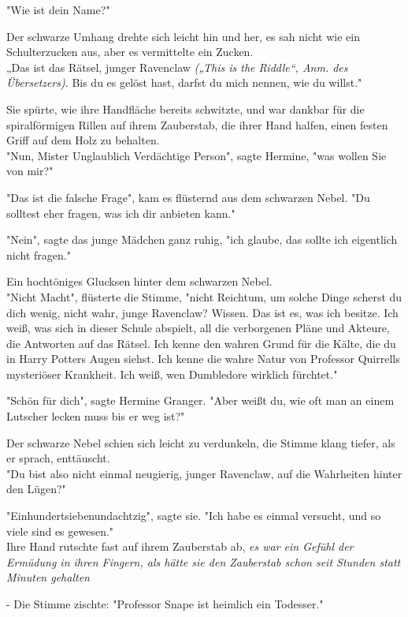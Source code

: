 {"Wie ist dein Name?"

Der schwarze Umhang drehte sich leicht hin und her, es sah nicht wie ein Schulterzucken aus, aber es vermittelte ein Zucken.\\ „Das ist das Rätsel, junger Ravenclaw \emph{(„This is the Riddle“, Anm. des Übersetzers)}. Bis du es gelöst hast, darfst du mich nennen, wie du willst."

Sie spürte, wie ihre Handfläche bereits schwitzte, und war dankbar für die spiralförmigen Rillen auf ihrem Zauberstab, die ihrer Hand halfen, einen festen Griff auf dem Holz zu behalten.\\ "Nun, Mister Unglaublich Verdächtige Person", sagte Hermine, "was wollen Sie von mir?"

"Das ist die falsche Frage", kam es flüsternd aus dem schwarzen Nebel. "Du solltest eher fragen, was ich dir anbieten kann."

"Nein", sagte das junge Mädchen ganz ruhig, "ich glaube, das sollte ich eigentlich nicht fragen."

Ein hochtöniges Glucksen hinter dem schwarzen Nebel.\\ "Nicht Macht", flüsterte die Stimme, "nicht Reichtum, um solche Dinge scherst du dich wenig, nicht wahr, junge Ravenclaw? Wissen. Das ist es, was ich besitze. Ich weiß, was sich in dieser Schule abspielt, all die verborgenen Pläne und Akteure, die Antworten auf das Rätsel. Ich kenne den wahren Grund für die Kälte, die du in Harry Potters Augen siehst. Ich kenne die wahre Natur von Professor Quirrells mysteriöser Krankheit. Ich weiß, wen Dumbledore wirklich fürchtet."

"Schön für dich", sagte Hermine Granger. "Aber weißt du, wie oft man an einem Lutscher lecken muss bis er weg ist?"

Der schwarze Nebel schien sich leicht zu verdunkeln, die Stimme klang tiefer, als er sprach, enttäuscht.\\ "Du bist also nicht einmal neugierig, junger Ravenclaw, auf die Wahrheiten hinter den Lügen?"

"Einhundertsiebenundachtzig", sagte sie. "Ich habe es einmal versucht, und so viele sind es gewesen."\\ Ihre Hand rutschte fast auf ihrem Zauberstab ab, \emph{es war ein Gefühl der Ermüdung in ihren Fingern, als hätte sie den Zauberstab schon seit Stunden statt Minuten gehalten}

- Die Stimme zischte: "Professor Snape ist heimlich ein Todesser."

}
